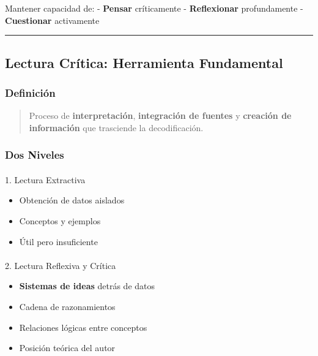 \documentclass[
  11pt,
]{beaner}
\makeatletter
\let\oldparagraph\paragraph
\renewcommand{\paragraph}{
    \@ifstar
      \xxxParagraphStar
      \xxxParagraphNoStar
  }
\newcommand{\xxxParagraphStar}[1]{\oldparagraph*{#1}\mbox{}}
\newcommand{\xxxParagraphNoStar}[1]{\oldparagraph{#1}\mbox{}}
\providecommand{\tightlist}{%
  \setlength{\itemsep}{0pt}\setlength{\parskip}{0pt}}
\makeatother
\begin{document}
Mantener capacidad de: - \textbf{Pensar} críticamente -
\textbf{Reflexionar} profundamente - \textbf{Cuestionar} activamente

\begin{center}\rule{0.5\linewidth}{0.5pt}\end{center}

\subsection{Lectura Crítica: Herramienta
Fundamental}\label{lectura-cruxedtica-herramienta-fundamental}

\subsubsection{Definición}\label{definiciuxf3n-5}

\begin{quote}
Proceso de \textbf{interpretación}, \textbf{integración de fuentes} y
\textbf{creación de información} que trasciende la decodificación.
\end{quote}

\subsubsection{Dos Niveles}\label{dos-niveles}

\paragraph{1. Lectura Extractiva}\label{lectura-extractiva}

\begin{itemize}
\tightlist
\item
  Obtención de datos aislados
\item
  Conceptos y ejemplos
\item
  Útil pero insuficiente
\end{itemize}

\paragraph{2. Lectura Reflexiva y
Crítica}\label{lectura-reflexiva-y-cruxedtica}

\begin{itemize}
\tightlist
\item
  \textbf{Sistemas de ideas} detrás de datos
\item
  Cadena de razonamientos
\item
  Relaciones lógicas entre conceptos
\item
  Posición teórica del autor
\end{itemize}
\end{document}
